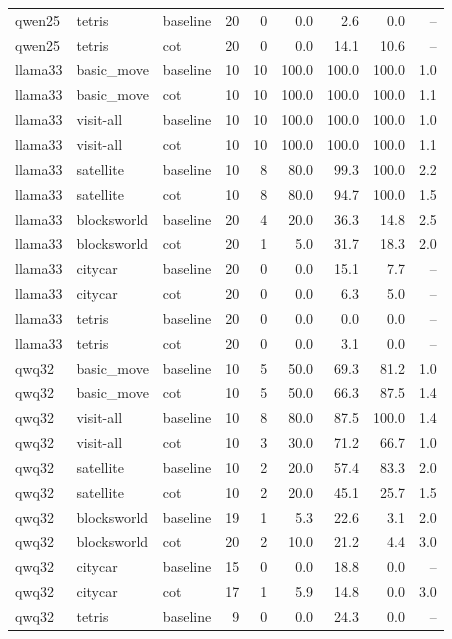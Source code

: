 \begin{tabular}{lllrrrrrr}
qwen25 & tetris & baseline & 20 & 0 & 0.0 & 2.6 & 0.0 & -- \\
qwen25 & tetris & cot & 20 & 0 & 0.0 & 14.1 & 10.6 & -- \\
llama33 & basic\_move & baseline & 10 & 10 & 100.0 & 100.0 & 100.0 & 1.0 \\
llama33 & basic\_move & cot & 10 & 10 & 100.0 & 100.0 & 100.0 & 1.1 \\
llama33 & visit-all & baseline & 10 & 10 & 100.0 & 100.0 & 100.0 & 1.0 \\
llama33 & visit-all & cot & 10 & 10 & 100.0 & 100.0 & 100.0 & 1.1 \\
llama33 & satellite & baseline & 10 & 8 & 80.0 & 99.3 & 100.0 & 2.2 \\
llama33 & satellite & cot & 10 & 8 & 80.0 & 94.7 & 100.0 & 1.5 \\
llama33 & blocksworld & baseline & 20 & 4 & 20.0 & 36.3 & 14.8 & 2.5 \\
llama33 & blocksworld & cot & 20 & 1 & 5.0 & 31.7 & 18.3 & 2.0 \\
llama33 & citycar & baseline & 20 & 0 & 0.0 & 15.1 & 7.7 & -- \\
llama33 & citycar & cot & 20 & 0 & 0.0 & 6.3 & 5.0 & -- \\
llama33 & tetris & baseline & 20 & 0 & 0.0 & 0.0 & 0.0 & -- \\
llama33 & tetris & cot & 20 & 0 & 0.0 & 3.1 & 0.0 & -- \\
qwq32 & basic\_move & baseline & 10 & 5 & 50.0 & 69.3 & 81.2 & 1.0 \\
qwq32 & basic\_move & cot & 10 & 5 & 50.0 & 66.3 & 87.5 & 1.4 \\
qwq32 & visit-all & baseline & 10 & 8 & 80.0 & 87.5 & 100.0 & 1.4 \\
qwq32 & visit-all & cot & 10 & 3 & 30.0 & 71.2 & 66.7 & 1.0 \\
qwq32 & satellite & baseline & 10 & 2 & 20.0 & 57.4 & 83.3 & 2.0 \\
qwq32 & satellite & cot & 10 & 2 & 20.0 & 45.1 & 25.7 & 1.5 \\
qwq32 & blocksworld & baseline & 19 & 1 & 5.3 & 22.6 & 3.1 & 2.0 \\
qwq32 & blocksworld & cot & 20 & 2 & 10.0 & 21.2 & 4.4 & 3.0 \\
qwq32 & citycar & baseline & 15 & 0 & 0.0 & 18.8 & 0.0 & -- \\
qwq32 & citycar & cot & 17 & 1 & 5.9 & 14.8 & 0.0 & 3.0 \\
qwq32 & tetris & baseline & 9 & 0 & 0.0 & 24.3 & 0.0 & -- \\

\end{tabular}
